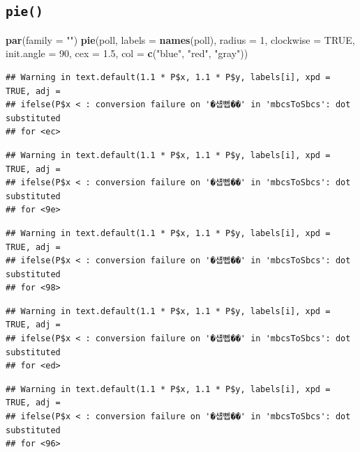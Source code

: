 \documentclass[
]{article}
\newenvironment{Shaded}{\begin{snugshade}}{\end{snugshade}}
\newcommand{\DataTypeTok}[1]{\textcolor[rgb]{0.13,0.29,0.53}{#1}}
\newcommand{\DecValTok}[1]{\textcolor[rgb]{0.00,0.00,0.81}{#1}}
\newcommand{\FloatTok}[1]{\textcolor[rgb]{0.00,0.00,0.81}{#1}}
\newcommand{\KeywordTok}[1]{\textcolor[rgb]{0.13,0.29,0.53}{\textbf{#1}}}
\newcommand{\NormalTok}[1]{#1}
\newcommand{\OtherTok}[1]{\textcolor[rgb]{0.56,0.35,0.01}{#1}}
\newcommand{\StringTok}[1]{\textcolor[rgb]{0.31,0.60,0.02}{#1}}
\begin{document}
\hypertarget{pie}{%
\subsection{\texorpdfstring{\texttt{pie()}}{pie()}}\label{pie}}

\begin{Shaded}
\begin{Highlighting}[]
\KeywordTok{par}\NormalTok{(}\DataTypeTok{family =} \StringTok{""}\NormalTok{)}
\KeywordTok{pie}\NormalTok{(poll, }
    \DataTypeTok{labels =} \KeywordTok{names}\NormalTok{(poll), }
    \DataTypeTok{radius =} \DecValTok{1}\NormalTok{,}
    \DataTypeTok{clockwise =} \OtherTok{TRUE}\NormalTok{, }
    \DataTypeTok{init.angle =} \DecValTok{90}\NormalTok{, }
    \DataTypeTok{cex =} \FloatTok{1.5}\NormalTok{,}
    \DataTypeTok{col =} \KeywordTok{c}\NormalTok{(}\StringTok{"blue"}\NormalTok{, }\StringTok{"red"}\NormalTok{, }\StringTok{"gray"}\NormalTok{))}
\end{Highlighting}
\end{Shaded}

\begin{verbatim}
## Warning in text.default(1.1 * P$x, 1.1 * P$y, labels[i], xpd = TRUE, adj =
## ifelse(P$x < : conversion failure on '�섑뻽��' in 'mbcsToSbcs': dot substituted
## for <ec>
\end{verbatim}

\begin{verbatim}
## Warning in text.default(1.1 * P$x, 1.1 * P$y, labels[i], xpd = TRUE, adj =
## ifelse(P$x < : conversion failure on '�섑뻽��' in 'mbcsToSbcs': dot substituted
## for <9e>
\end{verbatim}

\begin{verbatim}
## Warning in text.default(1.1 * P$x, 1.1 * P$y, labels[i], xpd = TRUE, adj =
## ifelse(P$x < : conversion failure on '�섑뻽��' in 'mbcsToSbcs': dot substituted
## for <98>
\end{verbatim}

\begin{verbatim}
## Warning in text.default(1.1 * P$x, 1.1 * P$y, labels[i], xpd = TRUE, adj =
## ifelse(P$x < : conversion failure on '�섑뻽��' in 'mbcsToSbcs': dot substituted
## for <ed>
\end{verbatim}

\begin{verbatim}
## Warning in text.default(1.1 * P$x, 1.1 * P$y, labels[i], xpd = TRUE, adj =
## ifelse(P$x < : conversion failure on '�섑뻽��' in 'mbcsToSbcs': dot substituted
## for <96>
\end{verbatim}
\end{document}
